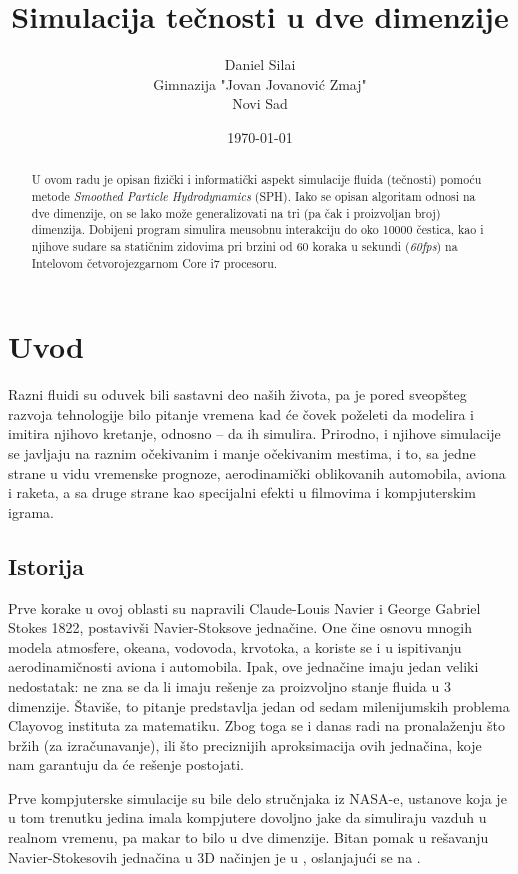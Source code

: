 \documentclass[12pt]{article}
\title{Simulacija te\v cnosti u dve dimenzije}
\author{
        Daniel Sila\dj i \\
        Gimnazija "Jovan Jovanovi\'{c} Zmaj"\\
		Novi Sad
}
\date{\today}
\begin{document}
\maketitle

\begin{abstract}
U ovom radu je opisan fizi\v cki i informati\v cki aspekt simulacije fluida (te\v cnosti) pomo\'cu metode \emph{Smoothed Particle Hydrodynamics} (SPH). Iako se opisan algoritam odnosi na dve dimenzije, on se lako mo\v ze generalizovati na tri (pa \v cak i proizvoljan broj) dimenzija. Dobijeni program simulira me\dj usobnu interakciju do oko 10000 \v cestica, kao i njihove sudare sa stati\v cnim zidovima pri brzini od 60 koraka u sekundi (\emph{60fps}) na Intelovom \v cetvorojezgarnom Core i7 procesoru.
\end{abstract}

\section{Uvod}\label{uvod}
    Razni fluidi su oduvek bili sastavni deo na\v sih \v zivota, pa je pored sveop\v steg razvoja tehnologije bilo pitanje vremena kad \'ce \v covek po\v zeleti da modelira i imitira njihovo kretanje, odnosno -- da ih simulira. Prirodno, i njihove simulacije se javljaju na raznim o\v cekivanim i manje o\v cekivanim mestima, i to, sa jedne strane u vidu vremenske prognoze, aerodinami\v cki oblikovanih automobila, aviona i raketa, a sa druge strane kao specijalni efekti u filmovima i kompjuterskim igrama.

    \subsection{Istorija}\label{istorija}
        Prve korake u ovoj oblasti su napravili Claude-Louis Navier i George Gabriel Stokes 1822, postaviv\v si Navier-Stoksove jedna\v cine.
        One \v cine osnovu mnogih modela atmosfere, okeana, vodovoda, krvotoka, a koriste se i u ispitivanju aerodinami\v cnosti aviona i automobila. Ipak, ove jedna\v cine imaju jedan veliki nedostatak: ne zna se da li imaju re\v senje za proizvoljno stanje fluida u 3 dimenzije. \v Stavi\v se, to pitanje predstavlja jedan od sedam milenijumskih problema Clayovog instituta za matematiku. Zbog toga se i danas radi na pronala\v zenju \v sto br\v zih (za izra\v cunavanje), ili \v sto preciznijih aproksimacija ovih jedna\v cina, koje nam garantuju da \'ce re\v senje postojati.

        Prve kompjuterske simulacije su bile delo stru\v cnjaka iz NASA-e, ustanove koja je u tom trenutku jedina imala kompjutere dovoljno jake da simuliraju vazduh u realnom vremenu, pa makar to bilo u dve dimenzije. Bitan pomak u re\v savanju Navier-Stokesovih jedna\v cina u 3D na\v cinjen je u \cite{Foster:1996:RAL:244304.244315}, oslanjaju\'ci se na \cite{harlow:2182}.
\end{document}
